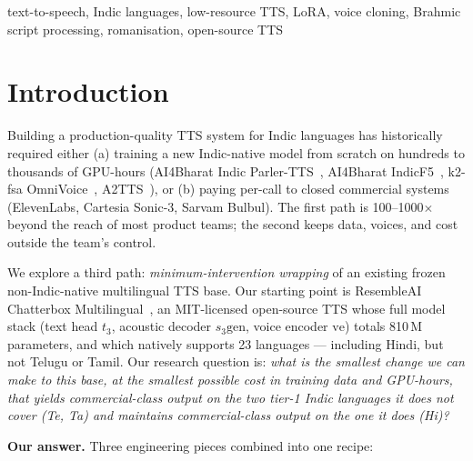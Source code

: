 \documentclass[conference,a4paper]{IEEEtran}
\begin{document}
\begin{abstract}
intra-sentential code-mixed input we add a third branch (IndicF5 + native-script transliteration preprocessor) that drops LLM-WER on code-mix from 0.80--0.85 (raw IndicF5) to 0.14--0.27 across Hi/Te/Ta --- closing most of the gap on Te while remaining clearly behind commercial systems on Hi. We release the R6 LoRA weights under Apache-2.0, the inference code (including the code-mix preprocessor and a unified production router) under MIT, and a Gradio demo.
\end{abstract}

\begin{IEEEkeywords}
text-to-speech, Indic languages, low-resource TTS, LoRA, voice cloning, Brahmic script processing, romanisation, open-source TTS
\end{IEEEkeywords}

\section{Introduction}
\label{sec:intro}

Building a production-quality TTS system for Indic languages has historically required either (a) training a new Indic-native model from scratch on hundreds to thousands of GPU-hours (AI4Bharat Indic Parler-TTS~\cite{parler2024}, AI4Bharat IndicF5~\cite{indicf52024}, k2-fsa OmniVoice~\cite{omnivoice2026}, A2TTS~\cite{a2tts2025}), or (b) paying per-call to closed commercial systems (ElevenLabs, Cartesia Sonic-3, Sarvam Bulbul). The first path is 100--1000$\times$ beyond the reach of most product teams; the second keeps data, voices, and cost outside the team's control.

We explore a third path: \emph{minimum-intervention wrapping} of an existing frozen non-Indic-native multilingual TTS base. Our starting point is ResembleAI Chatterbox Multilingual~\cite{chatterbox2025}, an MIT-licensed open-source TTS whose full model stack (text head $t_3$, acoustic decoder $s_3\text{gen}$, voice encoder $\text{ve}$) totals 810\,M parameters, and which natively supports 23 languages --- including Hindi, but not Telugu or Tamil. Our research question is: \emph{what is the smallest change we can make to this base, at the smallest possible cost in training data and GPU-hours, that yields commercial-class output on the two tier-1 Indic languages it does not cover (Te, Ta) and maintains commercial-class output on the one it does (Hi)?}

\textbf{Our answer.} Three engineering pieces combined into one recipe:
\end{document}
